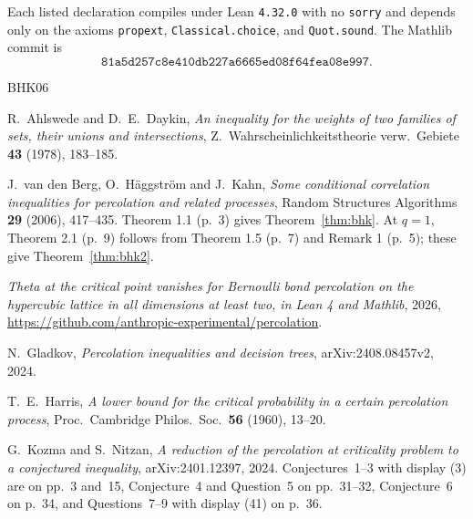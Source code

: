 \documentclass[11pt]{article}
\theoremstyle{definition}
\theoremstyle{remark}
\begin{document}
Each listed declaration compiles under Lean \texttt{4.32.0} with no \texttt{sorry} and
depends only on the axioms \texttt{propext}, \texttt{Classical.choice}, and
\texttt{Quot.sound}. The Mathlib commit is
\[
 \texttt{81a5d257c8e410db227a6665ed08f64fea08e997}.
\]
\endgroup

\begin{thebibliography}{BHK06}
\setlength{\itemsep}{1pt}\setlength{\parskip}{0pt}

 R.~Ahlswede and D.~E.~Daykin, \emph{An inequality for the weights of two
families of sets, their unions and intersections}, Z.~Wahrscheinlichkeitstheorie verw.\
Gebiete \textbf{43} (1978), 183--185.

 J.~van den Berg, O.~H\"aggstr\"om and J.~Kahn, \emph{Some conditional
correlation inequalities for percolation and related processes}, Random Structures
Algorithms \textbf{29} (2006), 417--435. Theorem 1.1 (p.~3) gives
Theorem~\ref{thm:bhk}. At $q=1$, Theorem 2.1 (p.~9) follows from Theorem 1.5 (p.~7) and
Remark 1 (p.~5); these give Theorem~\ref{thm:bhk2}.

 \emph{Theta at the critical point vanishes for Bernoulli bond
percolation on the hypercubic lattice in all dimensions at least two, in Lean 4 and
Mathlib}, 2026, \url{https://github.com/anthropic-experimental/percolation}.

 N.~Gladkov, \emph{Percolation inequalities and decision trees},
arXiv:2408.08457v2, 2024.

 T.~E.~Harris, \emph{A lower bound for the critical probability in a certain
percolation process}, Proc.\ Cambridge Philos.\ Soc.\ \textbf{56} (1960), 13--20.

 G.~Kozma and S.~Nitzan, \emph{A reduction of the percolation at
criticality problem to a conjectured inequality}, arXiv:2401.12397, 2024. Conjectures~1--3
with display (3) are on pp.~3 and~15, Conjecture~4 and Question~5 on pp.~31--32,
Conjecture~6 on p.~34, and Questions~7--9 with display (41) on p.~36.

\end{thebibliography}
\end{document}
